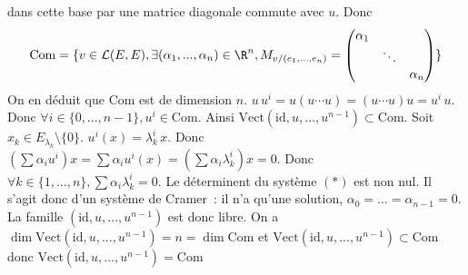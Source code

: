 {\begin{enumerate}
{    dans cette base par une matrice diagonale commute avec $u$. Donc
    $$
    \mathrm{Com}=\{v\in\mathcal{L}(E,E), \exists (\alpha_{1},...,\alpha_{n})\in\R^{n},
    M_{v/(e_{1},...,e_{n})}=
      \begin{pmatrix}
        \alpha_{1}& & \\ &\ddots& \\ & & \alpha_{n}
      \end{pmatrix}
      \}$$
    On en déduit que $\mathrm{Com}$ est de dimension $n$.
$u\,u^{i}=u(u\cdots u)=(u\cdots u)u=u^{i}\, u$. Donc $\forall
    i\in\{0,...,n-1\}, u^{i}\in\mathrm{Com}$. Ainsi
    $\mathrm{Vect}(\mathrm{id},u,...,u^{n-1})\subset\mathrm{Com}$.
Soit $x_{k}\in E_{\lambda_{k}}\setminus\{0\}$.
    $u^{i}(x)=\lambda_{k}^{i}\,x$. Donc $(\sum \alpha_{i}u^{i})x
    =\sum\alpha_{i}u^{i}(x) =(\sum\alpha_{i}\lambda_{k}^{i})x=0$. Donc
    $\forall k\in\{1,...,n\}, \sum\alpha_{i}\lambda_{k}^{i}=0$.
Le déterminent du système $(*)$ est non nul. Il s'agit donc d'un
    système de Cramer~: il n'a qu'une solution,
    $\alpha_{0}=...=\alpha_{n-1}=0$. La famille $(\mathrm{id}, u, ..., u^{n-1})$
    est donc libre.
On a $\dim\mathrm{Vect}(\mathrm{id}, u, ..., u^{n-1})=n=\dim\mathrm{Com}$ et $\mathrm{Vect}(\mathrm{id}, u,
    ..., u^{n-1})\subset\mathrm{Com}$ donc $\mathrm{Vect}(\mathrm{id}, u, ..., u^{n-1})=\mathrm{Com}$
}
\end{enumerate}
}
